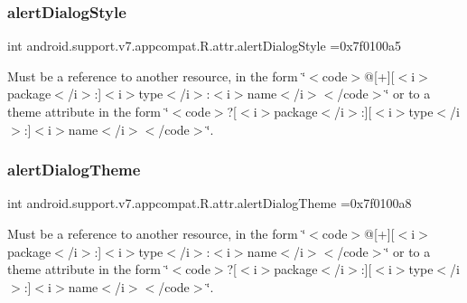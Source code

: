 \subsubsection{\texorpdfstring{alert\+Dialog\+Style}{alertDialogStyle}}
{\footnotesize\ttfamily int android.\+support.\+v7.\+appcompat.\+R.\+attr.\+alert\+Dialog\+Style =0x7f0100a5\hspace{0.3cm}{\ttfamily [static]}}

Must be a reference to another resource, in the form \char`\"{}$<$code$>$@\mbox{[}+\mbox{]}\mbox{[}$<$i$>$package$<$/i$>$\+:\mbox{]}$<$i$>$type$<$/i$>$\+:$<$i$>$name$<$/i$>$$<$/code$>$\char`\"{} or to a theme attribute in the form \char`\"{}$<$code$>$?\mbox{[}$<$i$>$package$<$/i$>$\+:\mbox{]}\mbox{[}$<$i$>$type$<$/i$>$\+:\mbox{]}$<$i$>$name$<$/i$>$$<$/code$>$\char`\"{}. \mbox{\label{classandroid_1_1support_1_1v7_1_1appcompat_1_1R_1_1attr_a598b5c765c91688704f66e15a7a0a7f6}} 
\subsubsection{\texorpdfstring{alert\+Dialog\+Theme}{alertDialogTheme}}
{\footnotesize\ttfamily int android.\+support.\+v7.\+appcompat.\+R.\+attr.\+alert\+Dialog\+Theme =0x7f0100a8\hspace{0.3cm}{\ttfamily [static]}}

Must be a reference to another resource, in the form \char`\"{}$<$code$>$@\mbox{[}+\mbox{]}\mbox{[}$<$i$>$package$<$/i$>$\+:\mbox{]}$<$i$>$type$<$/i$>$\+:$<$i$>$name$<$/i$>$$<$/code$>$\char`\"{} or to a theme attribute in the form \char`\"{}$<$code$>$?\mbox{[}$<$i$>$package$<$/i$>$\+:\mbox{]}\mbox{[}$<$i$>$type$<$/i$>$\+:\mbox{]}$<$i$>$name$<$/i$>$$<$/code$>$\char`\"{}. \mbox{\label{classandroid_1_1support_1_1v7_1_1appcompat_1_1R_1_1attr_ac79789d7ec66b59b872a66a3729ba8c0}} 
